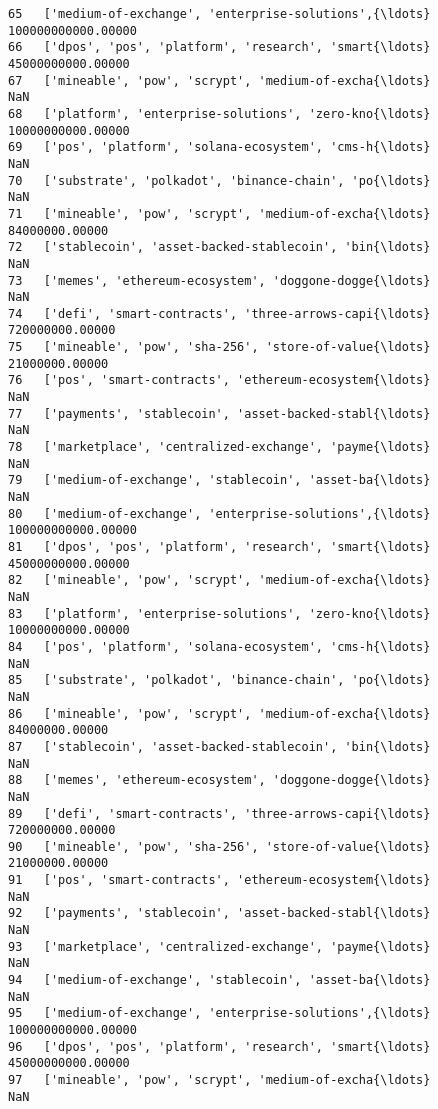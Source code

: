\documentclass[11pt]{article}
\begin{document}
\begin{tcolorbox}[breakable, size=fbox, boxrule=.5pt, pad at break*=1mm, opacityfill=0]
\begin{Verbatim}[commandchars=\\\{\}]
65   ['medium-of-exchange', 'enterprise-solutions',{\ldots} 100000000000.00000
66   ['dpos', 'pos', 'platform', 'research', 'smart{\ldots}  45000000000.00000
67   ['mineable', 'pow', 'scrypt', 'medium-of-excha{\ldots}                NaN
68   ['platform', 'enterprise-solutions', 'zero-kno{\ldots}  10000000000.00000
69   ['pos', 'platform', 'solana-ecosystem', 'cms-h{\ldots}                NaN
70   ['substrate', 'polkadot', 'binance-chain', 'po{\ldots}                NaN
71   ['mineable', 'pow', 'scrypt', 'medium-of-excha{\ldots}     84000000.00000
72   ['stablecoin', 'asset-backed-stablecoin', 'bin{\ldots}                NaN
73   ['memes', 'ethereum-ecosystem', 'doggone-dogge{\ldots}                NaN
74   ['defi', 'smart-contracts', 'three-arrows-capi{\ldots}    720000000.00000
75   ['mineable', 'pow', 'sha-256', 'store-of-value{\ldots}     21000000.00000
76   ['pos', 'smart-contracts', 'ethereum-ecosystem{\ldots}                NaN
77   ['payments', 'stablecoin', 'asset-backed-stabl{\ldots}                NaN
78   ['marketplace', 'centralized-exchange', 'payme{\ldots}                NaN
79   ['medium-of-exchange', 'stablecoin', 'asset-ba{\ldots}                NaN
80   ['medium-of-exchange', 'enterprise-solutions',{\ldots} 100000000000.00000
81   ['dpos', 'pos', 'platform', 'research', 'smart{\ldots}  45000000000.00000
82   ['mineable', 'pow', 'scrypt', 'medium-of-excha{\ldots}                NaN
83   ['platform', 'enterprise-solutions', 'zero-kno{\ldots}  10000000000.00000
84   ['pos', 'platform', 'solana-ecosystem', 'cms-h{\ldots}                NaN
85   ['substrate', 'polkadot', 'binance-chain', 'po{\ldots}                NaN
86   ['mineable', 'pow', 'scrypt', 'medium-of-excha{\ldots}     84000000.00000
87   ['stablecoin', 'asset-backed-stablecoin', 'bin{\ldots}                NaN
88   ['memes', 'ethereum-ecosystem', 'doggone-dogge{\ldots}                NaN
89   ['defi', 'smart-contracts', 'three-arrows-capi{\ldots}    720000000.00000
90   ['mineable', 'pow', 'sha-256', 'store-of-value{\ldots}     21000000.00000
91   ['pos', 'smart-contracts', 'ethereum-ecosystem{\ldots}                NaN
92   ['payments', 'stablecoin', 'asset-backed-stabl{\ldots}                NaN
93   ['marketplace', 'centralized-exchange', 'payme{\ldots}                NaN
94   ['medium-of-exchange', 'stablecoin', 'asset-ba{\ldots}                NaN
95   ['medium-of-exchange', 'enterprise-solutions',{\ldots} 100000000000.00000
96   ['dpos', 'pos', 'platform', 'research', 'smart{\ldots}  45000000000.00000
97   ['mineable', 'pow', 'scrypt', 'medium-of-excha{\ldots}                NaN

\end{Verbatim}
\end{tcolorbox}
\end{document}
